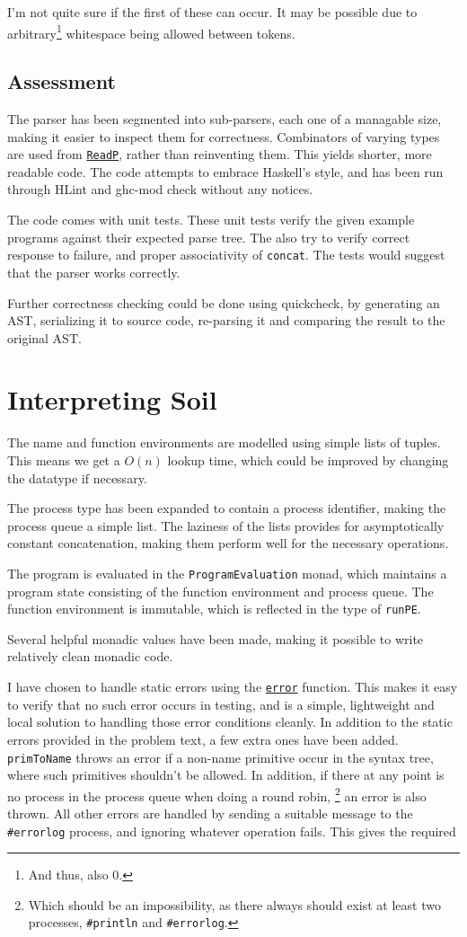 \documentclass[11pt,a4paper]{article}
\newcommand{\hoogle}[1]{\href{http://www.haskell.org/hoogle/?hoogle=#1}
                             {\texttt{#1}}}
\begin{document}
I'm not quite sure if the first of these can occur. It may be possible due to
arbitrary\footnote{And thus, also 0.} whitespace being allowed between tokens.

\subsection{Assessment}
The parser has been segmented into sub-parsers, each one of a managable size,
making it easier to inspect them for correctness. Combinators of varying
types are used from \hoogle{ReadP}, rather than reinventing them. This yields
shorter, more readable code. The code attempts to embrace Haskell's style, and
has been run through HLint and ghc-mod check without any notices.

The code comes with unit tests. These unit tests verify the given example
programs against their expected parse tree. The also try to verify correct
response to failure, and proper associativity of \texttt{concat}. The tests
would suggest that the parser works correctly.

Further correctness checking could be done using quickcheck, by generating an
AST, serializing it to source code, re-parsing it and comparing the result to
the original AST.

\section{Interpreting Soil}
The name and function environments are modelled using simple lists of tuples.
This means we get a $O(n)$ lookup time, which could be improved by changing the
datatype if necessary.

The process type has been expanded to contain a process identifier, making the
process queue a simple list. The laziness of the lists provides for asymptotically
constant concatenation, making them perform well for the necessary operations.

The program is evaluated in the \texttt{ProgramEvaluation} monad, which
maintains a program state consisting of the function environment and process
queue. The function environment is immutable, which is reflected in the type
of \texttt{runPE}.

Several helpful monadic values have been made, making it possible to write
relatively clean monadic code.

I have chosen to handle static errors using the \hoogle{error} function.
This makes it easy to verify that no such error occurs in testing, and is a
simple, lightweight and local solution to handling those error conditions
cleanly. In addition to the static errors provided in the problem text, a
few extra ones have been added. \texttt{primToName} throws an error if a
non-name primitive occur in the syntax tree, where such primitives shouldn't
be allowed. In addition, if there at any point is no process in the process
queue when doing a round robin, \footnote{Which should be an impossibility,
as there always should exist at least two processes, \texttt{\#println} and
\texttt{\#errorlog}.} an error is also thrown. All other errors are handled by
sending a suitable message to the \texttt{\#errorlog} process, and ignoring
whatever operation fails. This gives the required
\end{document}
